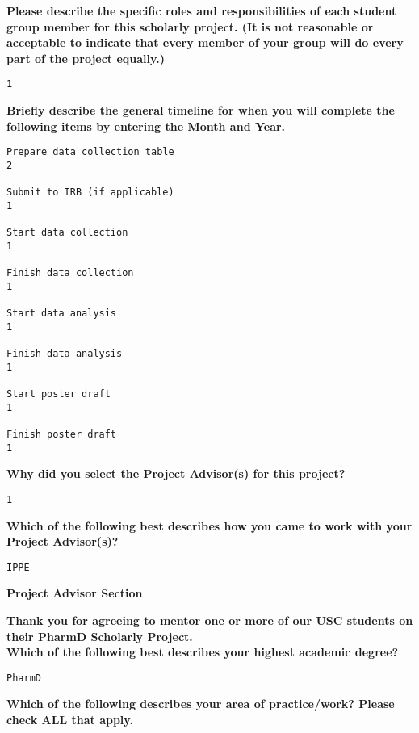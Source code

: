 \documentclass[11pt]{article}
\begin{document}
{\bfseries Please describe the specific roles and responsibilities of each student group member for this scholarly project. (It is not reasonable or acceptable to indicate that every member of your group will do every part of the project equally.)}
\begin{lstlisting}[mathescape]
1
\end{lstlisting}
\hfill

{\bfseries Briefly describe the general timeline for when you will complete the following items by entering the Month and Year.}
\begin{lstlisting}[mathescape]
Prepare data collection table
2

Submit to IRB (if applicable)
1

Start data collection
1

Finish data collection
1

Start data analysis
1

Finish data analysis
1

Start poster draft
1

Finish poster draft
1
\end{lstlisting}
\hfill

{\bfseries Why did you select the Project Advisor(s) for this project?}
\begin{lstlisting}[mathescape]
1
\end{lstlisting}
\hfill

{\bfseries Which of the following best describes how you came to work with your Project Advisor(s)?}
\begin{lstlisting}[mathescape]
IPPE
\end{lstlisting}
\hfill

\pagebreak
\begin{center}
	{\bfseries\large Project Advisor Section}
\end{center}

{\bfseries Thank you for agreeing to mentor one or more of our USC students on their PharmD Scholarly Project.}\\

{\bfseries Which of the following best describes your highest academic degree?}
\begin{lstlisting}[mathescape]
PharmD
\end{lstlisting}
\hfill

{\bfseries Which of the following describes your area of practice/work? Please check ALL that apply.}
\begin{lstlisting}[mathescape]

\end{lstlisting}
\hfill
\end{document}
